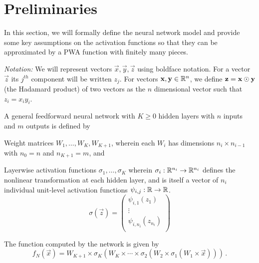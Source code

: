 \section{Preliminaries}\label{sec:range-analysis-problem}

In this section, we will formally define the neural network model and provide some key assumptions on the activation functions so that they can be approximated by a PWA function with finitely many pieces. 

\noindent\textit{Notation:} We will represent vectors $\vec{x}, \vec{y}, \vec{z}$ using boldface notation. For a vector $\vec{z}$ its $j^{th}$ component will be written $z_j$. For vectors $\mathbf{x}, \mathbf{y} \in \mathbb{R}^n$, we define $\mathbf{z} = \mathbf{x} \odot \mathbf{y}$ (the Hadamard product) of two vectors as the $n$ dimensional vector such that $z_i = x_i y_i$.

\begin{definition}\label{def:general-nn}
A general feedforward neural network with $K \geq 0$ hidden layers with $n$ inputs and $m$ outputs is defined by 
\begin{compactenum}
\item Weight matrices $W_1, \ldots, W_{K}, W_{K+1}$,  wherein each $W_i$ has dimensions $n_i \times n_{i-1}$ with $n_0 = n$ and $n_{K+1} = m$, and
\item Layerwise activation functions $\sigma_1, \ldots, \sigma_K$ wherein $\sigma_{i}: \mathbb{R}^{n_{i}} \rightarrow \mathbb{R}^{n_i}$ defines the nonlinear transformation at each hidden layer, and is itself a vector of $n_i$ individual unit-level activation functions $\psi_{i,j}: \mathbb{R} \rightarrow \mathbb{R}$.
\[ \sigma(\vec{z}) = \left(\begin{array}{c} 
\psi_{i,1}(z_1) \\ 
\vdots \\ 
\psi_{i, n_i}(z_{n_i}) \\ 
\end{array}\right)\]
\end{compactenum}
The function computed by the network is given by 
\[ f_N(\vec{x}) = W_{K+1} \times \sigma_K( W_K \times \cdots \times \sigma_2( W_2 \times \sigma_1( W_1 \times \vec{x}))) \,.\]
\end{definition}


